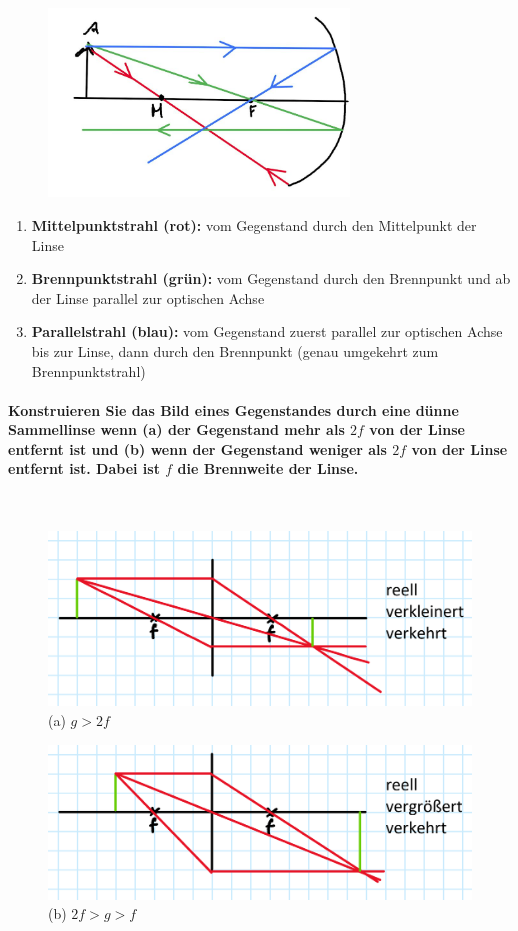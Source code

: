 \documentclass[a4paper, 11pt, ngerman, parskip=half-]{scrartcl}
\begin{document}
\begin{figure}[H]
    \centering
    \includegraphics[width=8cm]{image/17/geo14}
\end{figure}

\begin{enumerate}
    \item \textbf{Mittelpunktstrahl (rot):} vom Gegenstand durch den Mittelpunkt der Linse
    \item \textbf{Brennpunktstrahl (grün):} vom Gegenstand durch den Brennpunkt und ab der Linse parallel zur optischen Achse
    \item \textbf{Parallelstrahl (blau):} vom Gegenstand zuerst parallel zur optischen Achse bis zur Linse, dann durch den Brennpunkt (genau umgekehrt zum Brennpunktstrahl)
\end{enumerate}

\paragraph{Konstruieren Sie das Bild eines Gegenstandes durch eine dünne Sammellinse wenn (a) der
    Gegenstand mehr als $2f$ von der Linse entfernt ist und (b) wenn der Gegenstand weniger als $2f$ von
    der Linse entfernt ist. Dabei ist $f$ die Brennweite der Linse.} ~

\begin{figure}[H]
    \centering
    \includegraphics[width=0.8\linewidth]{image/16/konvex_2f.png}
    \caption{(a) $g > 2f$}
\end{figure}

\begin{figure}[H]
    \centering
    \includegraphics[width=0.8\linewidth]{image/16/konvex_f.png}
    \caption{(b) $2f > g > f$}
\end{figure}
\end{document}
